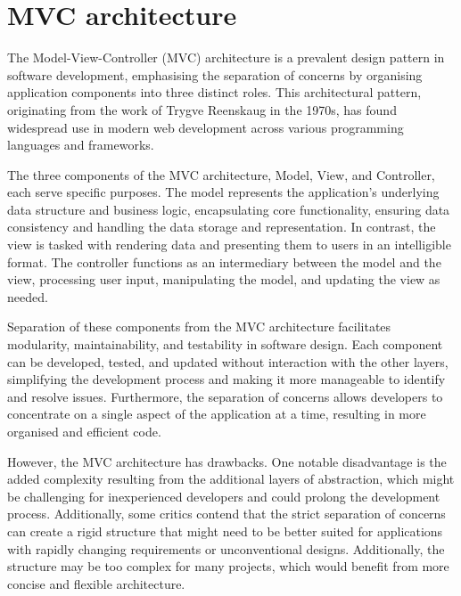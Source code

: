 \section{MVC architecture}
The Model-View-Controller (MVC) architecture is a prevalent design pattern in software development, emphasising the separation of concerns by organising application components into three distinct roles. This architectural pattern, originating from the work of Trygve Reenskaug in the 1970s, has found widespread use in modern web development across various programming languages and frameworks.\par
The three components of the MVC architecture, Model, View, and Controller, each serve specific purposes. The model represents the application's underlying data structure and business logic, encapsulating core functionality, ensuring data consistency and handling the data storage and representation. In contrast, the view is tasked with rendering data and presenting them to users in an intelligible format. The controller functions as an intermediary between the model and the view, processing user input, manipulating the model, and updating the view as needed.\par
Separation of these components from the MVC architecture facilitates modularity, maintainability, and testability in software design. Each component can be developed, tested, and updated without interaction with the other layers, simplifying the development process and making it more manageable to identify and resolve issues. Furthermore, the separation of concerns allows developers to concentrate on a single aspect of the application at a time, resulting in more organised and efficient code.\par
However, the MVC architecture has drawbacks. One notable disadvantage is the added complexity resulting from the additional layers of abstraction, which might be challenging for inexperienced developers and could prolong the development process. Additionally, some critics contend that the strict separation of concerns can create a rigid structure that might need to be better suited for applications with rapidly changing requirements or unconventional designs. Additionally, the structure may be too complex for many projects, which would benefit from more concise and flexible architecture.

